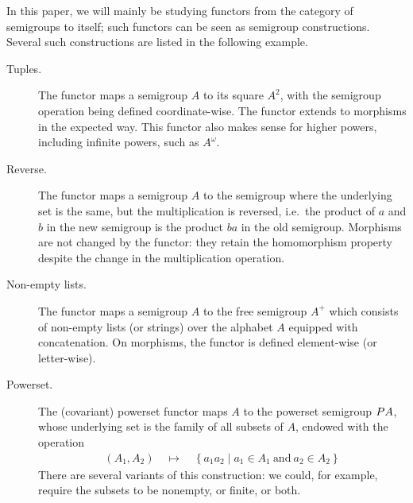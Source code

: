  \begin{example}\label{ex:functors}
    In this paper, we will mainly be studying functors from the category of semigroups to itself; such functors can be seen as semigroup constructions.  Several such constructions are listed in the following example. 
    \begin{description}
        \item[Tuples.] The functor maps a semigroup $A$ to its square $A^2$, with the semigroup operation being defined coordinate-wise. The functor extends to morphisms in the expected way. This functor also makes sense for higher powers, including infinite powers, such as $A^\omega$.
        \item[Reverse.] The functor maps a semigroup $A$ to the semigroup where the underlying set is the same, but the multiplication is reversed, i.e.~the product of $a$ and $b$ in the new semigroup is the product $ba$ in the old semigroup. Morphisms are not changed by the functor: they retain the homomorphism property despite the change in the multiplication operation.
        \item[Non-empty lists.] The functor maps a semigroup $A$ to the free semigroup $A^+$ which consists of non-empty lists (or strings) over the alphabet $A$ equipped with concatenation. On morphisms, the functor is defined element-wise (or letter-wise). 
        \item[Powerset.] The (covariant) powerset functor maps $A$ to the powerset semigroup $\powerset A$, whose underlying set is the family of all subsets of $A$, endowed with the operation
        \begin{align*}
        (A_1,A_2) \quad \mapsto \quad \left\{a_1 a_2 \mid a_1 \in A_1\ \text{and}\ a_2 \in A_2\right\}
        \end{align*}
        There are several variants of this construction: we could, for example,  require the subsets to be nonempty, or finite, or both.
    \end{description}
 \end{example}

